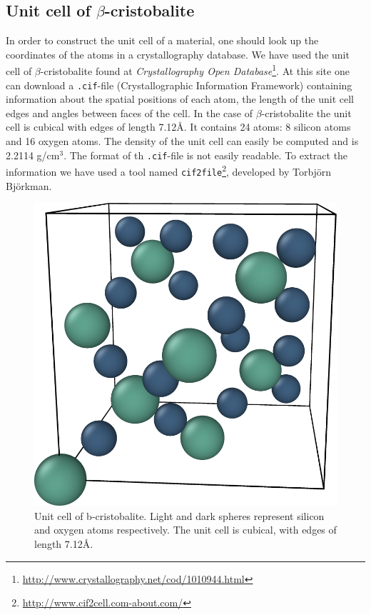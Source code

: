 \documentclass[twoside,english]{uiofysmaster}
\begin{document}
\subsection{Unit cell of $\beta$-cristobalite}
In order to construct the unit cell of a material, one should look up the coordinates of the atoms in a crystallography database. We have used the unit cell of $\beta$-cristobalite found at \textit{Crystallography Open Database}\footnote{\href{http://www.crystallography.net/cod/1010944.html}{http://www.crystallography.net/cod/1010944.html}}. 
At this site one can download a \texttt{.cif}-file (Crystallographic Information Framework) containing information about the spatial positions of each atom, the length of the unit cell edges and angles between faces of the cell. 
In the case of $\beta$-cristobalite the unit cell is cubical with edges of length 7.12Å. 
It contains 24 atoms: 8 silicon atoms and 16 oxygen atoms. 
The density of the unit cell can easily be computed and is 2.2114 g/cm$^3$.
The format of th \texttt{.cif}-file is not easily readable. To extract the information we have used a tool named \texttt{cif2file}\footnote{\href{http://www.cif2cell.com-about.com/}{http://www.cif2cell.com-about.com/}}, developed by Torbjörn Björkman. 

\begin{figure}
	\centering
	\includegraphics[width=0.5\linewidth]{figures/unitcell/unitCell.png}
	\caption{Unit cell of b-cristobalite. Light and dark spheres represent silicon and oxygen atoms respectively. The unit cell is cubical, with edges of length 7.12Å.}
	\label{fig:unitcellbcristobalite}
\end{figure}
\end{document}

